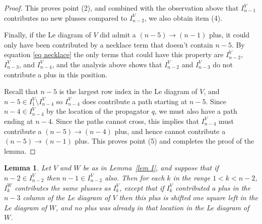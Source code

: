 \documentclass[11pt]{article}
\newtheorem{lem}[thm]{Lemma}
\theoremstyle{remark}
\theoremstyle{definition}
\begin{document}
\begin{proof}
This proves point (2), and combined with the observation above that $I_{n-1}^V$ contributes no new plusses compared to $I_{n-2}^V$, we also obtain item (4).


  Finally, if the Le diagram of $V$ did admit a $(n-5)\rightarrow (n-1)$ plus, it could only have been contributed by a necklace term that doesn't contain $n-5$.  By equation \eqref{eq necklace} the only terms that could have this property are $I_{n-2}^{V}$, $I_{n-3}^{V}$, and $I_{n-4}^{V}$, and the analysis above shows that $I_{n-2}^V$ and $I_{n-3}^V$ do not contribute a plus in this position.

  Recall that $n-5$ is the largest row index in the Le diagram of $V$, and $n-5 \in I_1^V \setminus I_{n-4}^V$ so $I_{n-4}^V$ does contribute a path starting at $n-5$. Since $n-4 \in I_{n-4}^V$ by the location of the propagator $q$, we must also have a path ending at $n-4$. Since the paths cannot cross, this implies that $I_{n-4}^V$ must contribute a $(n-5) \rightarrow (n-4)$ plus, and hence cannot contribute a $(n-5)\rightarrow (n-1)$ plus. This proves point (5) and completes the proof of the lemma.
\end{proof}


\begin{lem}\label{lem other k}
  Let $V$ and $W$ be as in Lemma~\ref{lem I}, and suppose that if $n-2\in I_{n-2}^{V}$ then $n-1\in I_{n-2}^{V}$ also. Then for each $k$ in the range $1<k<n-2$, $I_k^{W}$ contributes the same plusses as $I_{k}^{V}$, except that if $I_{k}^{V}$ contributed a plus in the $n-3$ column of the Le diagram of $V$ then this plus is shifted one square left in the Le diagram of $W$, and no plus was already in that location in the Le diagram of $W$.
\end{lem}
\end{document}

